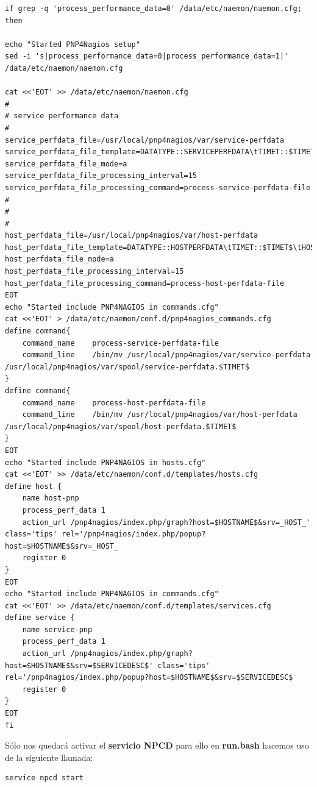 \begin{lstlisting}
if grep -q 'process_performance_data=0' /data/etc/naemon/naemon.cfg; then

echo "Started PNP4Nagios setup"
sed -i 's|process_performance_data=0|process_performance_data=1|' /data/etc/naemon/naemon.cfg

cat <<'EOT' >> /data/etc/naemon/naemon.cfg
#
# service performance data
#
service_perfdata_file=/usr/local/pnp4nagios/var/service-perfdata
service_perfdata_file_template=DATATYPE::SERVICEPERFDATA\tTIMET::$TIMET$\tHOSTNAME::$HOSTNAME$\tSERVICEDESC::$SERVICEDESC$\tSERVICEPERFDATA::$SERVICEPERFDATA$\tSERVICECHECKCOMMAND::$SERVICECHECKCOMMAND$\tHOSTSTATE::$HOSTSTATE$\tHOSTSTATETYPE::$HOSTSTATETYPE$\tSERVICESTATE::$SERVICESTATE$\tSERVICESTATETYPE::$SERVICESTATETYPE$
service_perfdata_file_mode=a
service_perfdata_file_processing_interval=15
service_perfdata_file_processing_command=process-service-perfdata-file
#
#
#
host_perfdata_file=/usr/local/pnp4nagios/var/host-perfdata
host_perfdata_file_template=DATATYPE::HOSTPERFDATA\tTIMET::$TIMET$\tHOSTNAME::$HOSTNAME$\tHOSTPERFDATA::$HOSTPERFDATA$\tHOSTCHECKCOMMAND::$HOSTCHECKCOMMAND$\tHOSTSTATE::$HOSTSTATE$\tHOSTSTATETYPE::$HOSTSTATETYPE$
host_perfdata_file_mode=a
host_perfdata_file_processing_interval=15
host_perfdata_file_processing_command=process-host-perfdata-file
EOT
echo "Started include PNP4NAGIOS in commands.cfg"
cat <<'EOT' > /data/etc/naemon/conf.d/pnp4nagios_commands.cfg
define command{
	command_name    process-service-perfdata-file
	command_line    /bin/mv /usr/local/pnp4nagios/var/service-perfdata /usr/local/pnp4nagios/var/spool/service-perfdata.$TIMET$
}
define command{
	command_name    process-host-perfdata-file
	command_line    /bin/mv /usr/local/pnp4nagios/var/host-perfdata /usr/local/pnp4nagios/var/spool/host-perfdata.$TIMET$
}
EOT
echo "Started include PNP4NAGIOS in hosts.cfg"
cat <<'EOT' >> /data/etc/naemon/conf.d/templates/hosts.cfg
define host {
	name host-pnp
	process_perf_data 1
	action_url /pnp4nagios/index.php/graph?host=$HOSTNAME$&srv=_HOST_' class='tips' rel='/pnp4nagios/index.php/popup?host=$HOSTNAME$&srv=_HOST_
	register 0
}
EOT
echo "Started include PNP4NAGIOS in commands.cfg"
cat <<'EOT' >> /data/etc/naemon/conf.d/templates/services.cfg
define service {
	name service-pnp
	process_perf_data 1
	action_url /pnp4nagios/index.php/graph?host=$HOSTNAME$&srv=$SERVICEDESC$' class='tips' rel='/pnp4nagios/index.php/popup?host=$HOSTNAME$&srv=$SERVICEDESC$
	register 0
}
EOT
fi
\end{lstlisting}
Sólo nos quedará activar el \textbf{servicio NPCD} para ello en \textbf{run.bash} hacemos uso de la siguiente llamada:
\begin{lstlisting}
service npcd start
\end{lstlisting}

